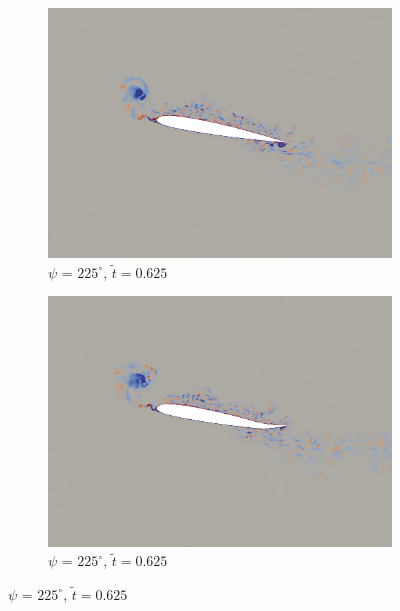 \begin{figure}[H]
	\begin{subfigure}[b]{0.4\textwidth}
		\centering
		\includegraphics[width=1\textwidth]{figures/SC1095/baseline/phase_225.png}
		\caption{ $\psi$ = $225^\circ$, $\tilde{t}=0.625$}
		\label{fig:SC1095_baseline_psi225}
	\end{subfigure}
	\begin{subfigure}[b]{0.4\textwidth}
		\centering
		\includegraphics[width=1\textwidth]{figures/SC1095/AC/phase_225.png}
		\caption{ $\psi$ = $225^\circ$,  $\tilde{t}=0.625$}
		\label{fig:SC1095_AC_psi225}
	\end{subfigure}
	
	
	

\end{figure}
